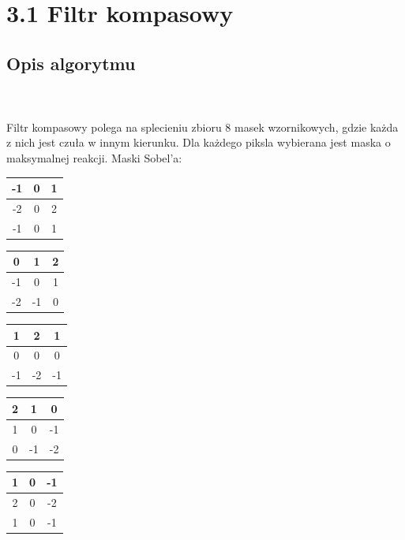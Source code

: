 \documentclass[final,a4paper,openany,12pt]{mwbk}
\begin{document}
\section*{3.1 Filtr kompasowy}
\subsection*{Opis algorytmu}
\hfill
\\\\
\indent Filtr kompasowy polega na splecieniu zbioru 8 masek wzornikowych, gdzie każda z nich jest czuła w innym kierunku. Dla każdego piksla wybierana jest maska o maksymalnej reakcji. Maski Sobel'a:

\begin{center}
	\begin{tabular}{|c|c|c|}
		\hline
		-1 & 0 & 1\\
		\hline
		-2 & 0 & 2\\
		\hline
		-1 & 0 & 1\\
		\hline
	\end{tabular}
\end{center}

\begin{center}
	\begin{tabular}{|c|c|c|}
		\hline
		0 & 1 & 2\\
		\hline
		-1 & 0 & 1\\
		\hline
		-2 & -1 & 0\\
		\hline
	\end{tabular}
\end{center}

\begin{center}
	\begin{tabular}{|c|c|c|}
		\hline
		1 & 2 & 1\\
		\hline
		0 & 0 & 0\\
		\hline
		-1 & -2 & -1\\
		\hline
	\end{tabular}
\end{center}

\begin{center}
	\begin{tabular}{|c|c|c|}
		\hline
		2 & 1 & 0\\
		\hline
		1 & 0 & -1\\
		\hline
		0 & -1 & -2\\
		\hline
	\end{tabular}
\end{center}

\begin{center}
	\begin{tabular}{|c|c|c|}
		\hline
		1 & 0 & -1\\
		\hline
		2 & 0 & -2\\
		\hline
		1 & 0 & -1\\
		\hline
	\end{tabular}
\end{center}
\end{document}
